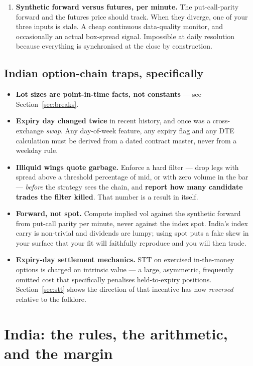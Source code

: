 \documentclass[11pt,a4paper]{article}
\begin{document}
\begin{enumerate}
\item \textbf{Synthetic forward versus futures, per minute.} The put-call-parity
forward and the futures price should track. When they diverge, one of your three
inputs is stale. A cheap continuous data-quality monitor, and occasionally an
actual box-spread signal. Impossible at daily resolution because everything is
synchronised at the close by construction.
\end{enumerate}

\subsection{Indian option-chain traps, specifically}

\begin{itemize}
\item \textbf{Lot sizes are point-in-time facts, not constants} --- see
Section~\ref{sec:breaks}.
\item \textbf{Expiry day changed twice} in recent history, and once was a
cross-exchange \emph{swap}. Any day-of-week feature, any expiry flag and any DTE
calculation must be derived from a dated contract master, never from a weekday rule.
\item \textbf{Illiquid wings quote garbage.} Enforce a hard filter --- drop legs
with spread above a threshold percentage of mid, or with zero volume in the bar
--- \emph{before} the strategy sees the chain, and \textbf{report how many
candidate trades the filter killed}. That number is a result in itself.
\item \textbf{Forward, not spot.} Compute implied vol against the synthetic
forward from put-call parity per minute, never against the index spot. India's
index carry is non-trivial and dividends are lumpy; using spot puts a fake skew in
your surface that your fit will faithfully reproduce and you will then trade.
\item \textbf{Expiry-day settlement mechanics.} STT on exercised in-the-money
options is charged on intrinsic value --- a large, asymmetric, frequently omitted
cost that specifically penalises held-to-expiry positions. Section~\ref{sec:stt}
shows the direction of that incentive has now \emph{reversed} relative to the
folklore.
\end{itemize}

\newpage
\section{India: the rules, the arithmetic, and the margin}
\label{sec:india}
\end{document}
